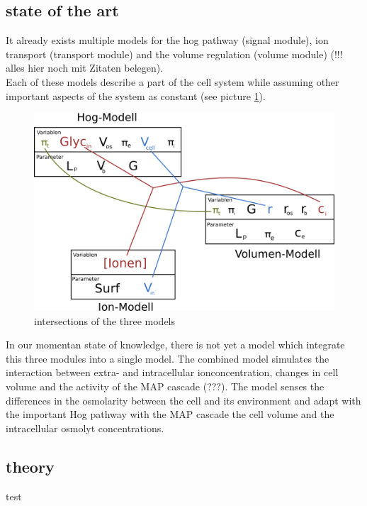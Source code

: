 \subsection{state of the art}
It already exists multiple models for the hog pathway (signal module), ion transport (transport module) and the volume regulation (volume module) (!!! alles hier noch mit Zitaten belegen). \\
Each of these models describe a part of the cell system while assuming other important aspects of the system as constant (see picture \ref{IntersectionsOfTheModels}).

\begin{figure}[h!]
	\begin{center}
		\begin{minipage}{0,8\textwidth}
			
			\includegraphics[width=\textwidth]{picture/model_intersections.png}
			\caption{intersections of the three models } 
			\label{IntersectionsOfTheModels} 
		\end{minipage}
	\end{center}
\end{figure}

In our momentan state of knowledge, there is not yet a model which integrate this three modules into a single model. The combined model simulates the interaction between extra- and intracellular ionconcentration, changes in cell volume and the activity of the MAP cascade (???). The model senses the differences in the osmolarity between the cell and its environment and adapt with the important Hog pathway with the MAP cascade the cell volume and the intracellular osmolyt concentrations. 

\subsection{theory}
test



